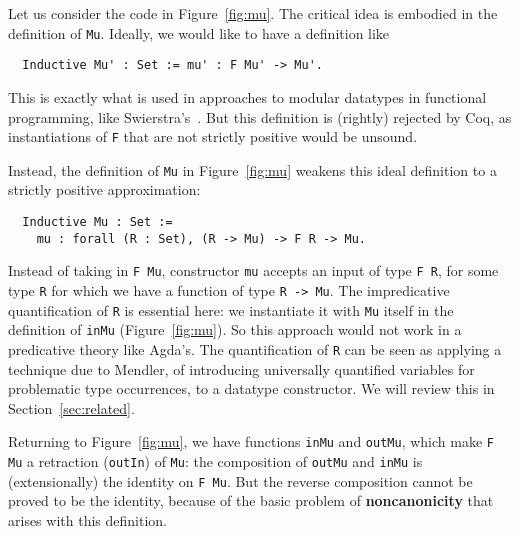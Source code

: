 \documentclass[a4paper,USenglish]{lipics-v2021}
\begin{document}
Let us consider the code in Figure~\ref{fig:mu}.  The critical
idea is embodied in the definition of \verb|Mu|.  Ideally, we would like
to have a definition like
\begin{verbatim}
  Inductive Mu' : Set := mu' : F Mu' -> Mu'.
\end{verbatim}
\noindent This is exactly what is used in approaches to modular
datatypes in functional programming, like
Swierstra's~\cite{swierstra08}.  But this definition is (rightly)
rejected by Coq, as instantiations of
\verb|F| that are not strictly positive would be unsound.

Instead, the definition of \verb|Mu| in Figure~\ref{fig:mu} weakens
this ideal definition to a strictly positive approximation:
\begin{verbatim}
  Inductive Mu : Set := 
    mu : forall (R : Set), (R -> Mu) -> F R -> Mu.
\end{verbatim}
\noindent Instead of taking in \verb|F Mu|, constructor \verb|mu|
accepts an input of type \verb|F R|, for some type \verb|R| for which
we have a function of type \verb|R -> Mu|.  The impredicative
quantification of \verb|R| is essential here: we instantiate it with
\verb|Mu| itself in the definition of \verb|inMu|
(Figure~\ref{fig:mu}).  So this approach would not work in a
predicative theory like Agda's.  The quantification of \verb|R| can be
seen as applying a technique due to Mendler, of introducing
universally quantified variables for problematic type occurrences, to
a datatype constructor.  We will review this in
Section~\ref{sec:related}.

Returning to Figure~\ref{fig:mu}, we have functions \verb|inMu| and
\verb|outMu|, which make \verb|F Mu| a retraction (\verb|outIn|) of
\verb|Mu|: the composition of \verb|outMu| and \verb|inMu| is
(extensionally) the identity on \verb|F Mu|.  But the reverse
composition cannot be proved to be the identity, because of the basic
problem of \textbf{noncanonicity} that arises with this definition.
\end{document}
